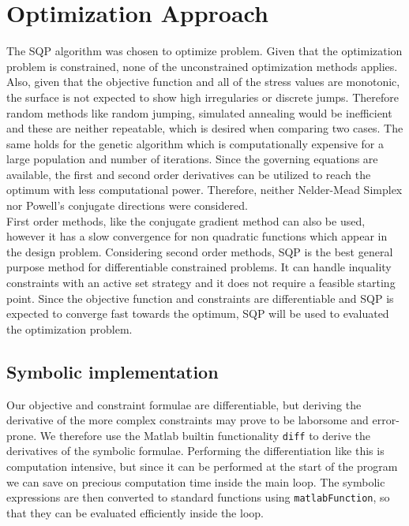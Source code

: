 \section{Optimization Approach}
The SQP algorithm was chosen to optimize problem. 
Given that the optimization problem is constrained, none of the unconstrained optimization methods applies.
Also, given that the objective function and all of the stress values are monotonic, the surface is not expected to show high irregularies or discrete jumps. Therefore random methods like random jumping, simulated annealing would be inefficient and these are neither repeatable, which is desired when comparing two cases. The same holds for the genetic algorithm which is computationally expensive for a large population and number of iterations.
Since the governing equations are available, the first and second order derivatives can be utilized to reach the optimum with less computational power. Therefore, neither Nelder-Mead Simplex nor Powell’s conjugate directions were considered.\\

First order methods, like the conjugate gradient method can also be used, however it has a slow convergence for non quadratic functions which appear in the design problem. Considering second order methods, SQP is the best general purpose method for differentiable constrained problems. It can handle inquality constraints with an active set strategy and it does not require a feasible starting point. Since the objective function and constraints are differentiable and SQP is expected to converge fast towards the optimum, SQP will be used to evaluated the optimization problem.
 



\subsection{Symbolic implementation}

\newcommand{\xvec}{\mathbf{x}}
\newcommand{\hvec}{\mathbf{h}}
\newcommand{\gvec}{\mathbf{g}}
\newcommand{\Wmat}{\mathbf{W}}
\newcommand{\Amat}{\mathbf{A}}
\newcommand{\lamvec}{\bm{\lambda}}

Our objective and constraint formulae are differentiable,
but deriving the derivative of the more complex constraints may prove to be laborsome and error-prone.
We therefore use the Matlab builtin functionality \verb|diff| to derive the derivatives of the symbolic formulae.
Performing the differentiation like this is computation intensive, but since it can be performed at the start of the program we can save on precious computation time inside the main loop.
The symbolic expressions are then converted to standard functions using \verb|matlabFunction|, so that they can be evaluated efficiently inside the loop.

